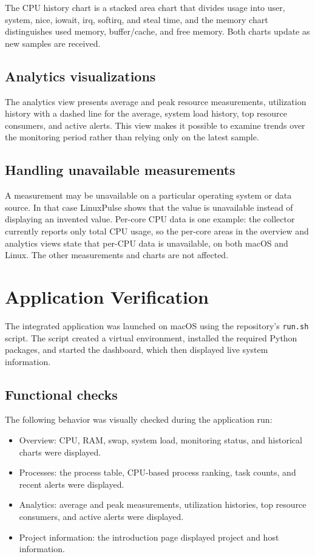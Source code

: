 \documentclass[11pt,a4paper]{article}
\begin{document}
The CPU history chart is a stacked area chart that divides usage into user,
system, nice, iowait, irq, softirq, and steal time, and the memory chart
distinguishes used memory, buffer/cache, and free memory. Both
charts update as new samples are received.

\subsection{Analytics visualizations}

The analytics view presents average and peak resource measurements, utilization
history with a dashed line for the average, system load history, top resource
consumers, and active alerts. This view makes it possible to examine trends over
the monitoring period rather than relying only on the latest sample.

\subsection{Handling unavailable measurements}

A measurement may be unavailable on a particular operating system or data
source. In that case LinuxPulse shows that the value is unavailable instead of
displaying an invented value. Per-core CPU data is one example: the collector
currently reports only total CPU usage, so the per-core areas in the overview
and analytics views state that per-CPU data is unavailable, on both macOS and
Linux. The other measurements and
charts are not affected.

\section{Application Verification}

The integrated application was launched on macOS using the repository's
\texttt{run.sh} script. The script created a virtual environment, installed the
required Python packages, and started the dashboard, which then displayed live
system information.

\subsection{Functional checks}

The following behavior was visually checked during the application run:
\begin{itemize}
    \item Overview: CPU, RAM, swap, system load, monitoring status, and
          historical charts were displayed.
    \item Processes: the process table, CPU-based process ranking, task counts,
          and recent alerts were displayed.
    \item Analytics: average and peak measurements, utilization histories,
          top resource consumers, and active alerts were displayed.
    \item Project information: the introduction page displayed project and
          host information.
\end{itemize}
\end{document}
